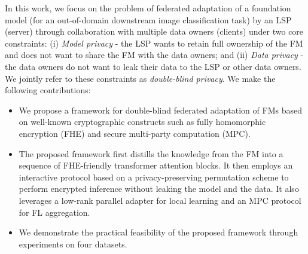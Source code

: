 In this work, we focus on the problem of federated adaptation of a foundation model (for an out-of-domain downstream image classification task) by an LSP (server) through collaboration with multiple data owners (clients) under two core constraints: (i) \textit{Model privacy} - the LSP wants to retain full ownership of the FM and does not want to share the FM with the data owners; and (ii) \textit{Data privacy} - the data owners do not want to leak their data to the LSP or other data owners. We jointly refer to these constraints as \textit{double-blind privacy}. We make the following contributions:

\begin{itemize}
    \item We propose a framework for double-blind federated adaptation of FMs based on well-known cryptographic constructs such as fully homomorphic encryption (FHE) and secure multi-party computation (MPC). 

    \item The proposed framework first distills the knowledge from the FM into a sequence of FHE-friendly transformer attention blocks. It then employs an interactive protocol based on a privacy-preserving permutation scheme to perform encrypted inference without leaking the model and the data. It also leverages a low-rank parallel adapter for local learning and an MPC protocol for FL aggregation.

    \item We demonstrate the practical feasibility of the proposed framework through experiments on four datasets.
\end{itemize}


